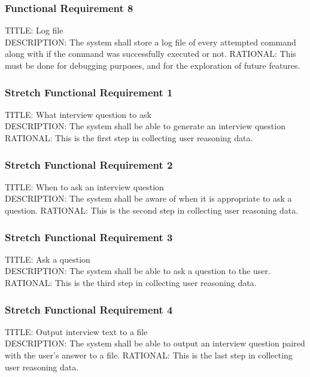 \documentclass[onecolumn, draftclsnofoot,10pt, compsoc]{IEEEtran}
\begin{document}
        \subsubsection{Functional Requirement 8}
        TITLE: Log file \\
        DESCRIPTION: The system shall store a log file of every attempted command along with if the command was successfully executed or not.
        RATIONAL: This must be done for debugging purposes, and for the exploration of future features.
        
        
        
        \subsubsection{Stretch Functional Requirement 1}
        TITLE: What interview question to ask \\
        DESCRIPTION: The system shall be able to generate an interview question
        RATIONAL: This is the first step in collecting user reasoning data. 
        
        
        \subsubsection{Stretch Functional Requirement 2}
        TITLE: When to ask an interview question \\
        DESCRIPTION: The system shall be aware of when it is appropriate to ask a question.
        RATIONAL: This is the second step in collecting user reasoning data. 
        
        \subsubsection{Stretch Functional Requirement 3}
        TITLE: Ask a question \\
        DESCRIPTION: The system shall be able to ask a question to the user.
        RATIONAL: This is the third step in collecting user reasoning data. 
        
        \subsubsection{Stretch Functional Requirement 4}
        TITLE: Output interview text to a file \\
        DESCRIPTION: The system shall be able to output an interview question paired with the user's answer to a file.
        RATIONAL: This is the last step in collecting user reasoning data. 
        
\end{document}
